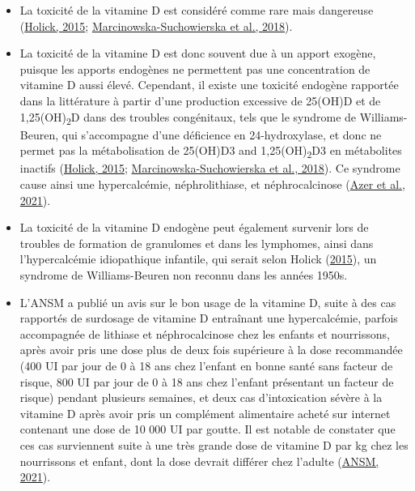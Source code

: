 \documentclass[
  letterpaper,
  DIV=11,
  numbers=noendperiod]{scrartcl}
\begin{document}
\begin{itemize}
\item
  La toxicité de la vitamine D est considéré comme rare mais dangereuse
  (\protect\hyperlink{ref-Holick.2015}{Holick, 2015};
  \protect\hyperlink{ref-Marcinowska-Suchowierska.2018}{Marcinowska-Suchowierska
  et al., 2018}).
\item
  La toxicité de la vitamine D est donc souvent due à un apport exogène,
  puisque les apports endogènes ne permettent pas une concentration de
  vitamine D aussi élevé. Cependant, il existe une toxicité endogène
  rapportée dans la littérature à partir d'une production excessive de
  25(OH)D et de 1,25(OH)\textsubscript{2}D dans des troubles
  congénitaux, tels que le syndrome de Williams-Beuren, qui s'accompagne
  d'une déficience en 24-hydroxylase, et donc ne permet pas la
  métabolisation de 25(OH)D3 and 1,25(OH)\textsubscript{2}D3 en
  métabolites inactifs (\protect\hyperlink{ref-Holick.2015}{Holick,
  2015};
  \protect\hyperlink{ref-Marcinowska-Suchowierska.2018}{Marcinowska-Suchowierska
  et al., 2018}). Ce syndrome cause ainsi une hypercalcémie,
  néphrolithiase, et néphrocalcinose
  (\protect\hyperlink{ref-Azer.2021}{Azer et al., 2021}).
\item
  La toxicité de la vitamine D endogène peut également survenir lors de
  troubles de formation de granulomes et dans les lymphomes, ainsi dans
  l'hypercalcémie idiopathique infantile, qui serait selon Holick
  (\protect\hyperlink{ref-Holick.2015}{2015}), un syndrome de
  Williams-Beuren non reconnu dans les années 1950s.
\item
  L'ANSM a publié un avis sur le bon usage de la vitamine D, suite à des
  cas rapportés de surdosage de vitamine D entraînant une hypercalcémie,
  parfois accompagnée de lithiase et néphrocalcinose chez les enfants et
  nourrissons, après avoir pris une dose plus de deux fois supérieure à
  la dose recommandée (400 UI par jour de 0 à 18 ans chez l'enfant en
  bonne santé sans facteur de risque, 800 UI par jour de 0 à 18 ans chez
  l'enfant présentant un facteur de risque) pendant plusieurs semaines,
  et deux cas d'intoxication sévère à la vitamine D après avoir pris un
  complément alimentaire acheté sur internet contenant une dose de 10
  000 UI par goutte. Il est notable de constater que ces cas surviennent
  suite à une très grande dose de vitamine D par kg chez les nourrissons
  et enfant, dont la dose devrait différer chez l'adulte
  (\protect\hyperlink{ref-ANSM.2021}{ANSM, 2021}).
\end{itemize}
\end{document}
